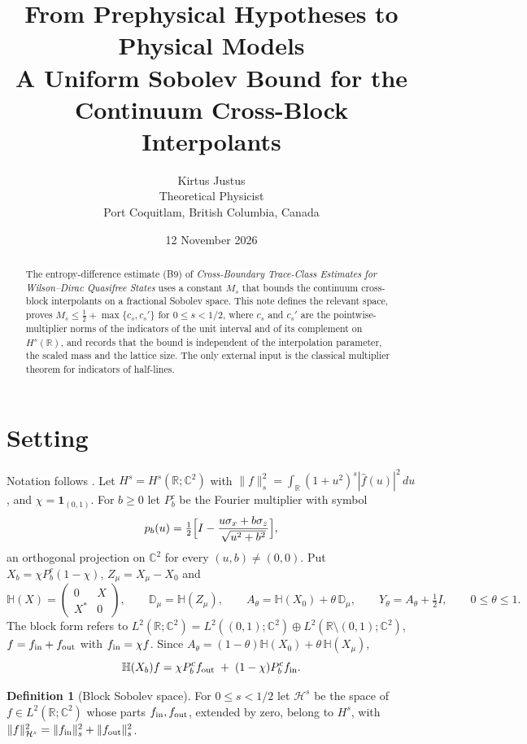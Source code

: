 \documentclass[11pt,a4paper]{article}
\title{\color{ink}\sffamily\large From Prephysical Hypotheses to Physical Models\\[9pt]\LARGE A Uniform Sobolev Bound for the Continuum Cross-Block Interpolants}
\author{Kirtus Justus\\\small Theoretical Physicist\\\small Port Coquitlam, British Columbia, Canada}
\date{12 November 2026}
\theoremstyle{definition}\newtheorem{definition}[theorem]{Definition}
\begin{document}
\maketitle
\begin{abstract}
The entropy-difference estimate (B9) of \emph{Cross-Boundary Trace-Class Estimates for Wilson--Dirac Quasifree States} uses a constant $M_s$ that bounds the continuum cross-block interpolants on a fractional Sobolev space. This note defines the relevant space, proves $M_s\le \tfrac12+\max\{c_s,c_s'\}$ for $0\le s<1/2$, where $c_s$ and $c_s'$ are the pointwise-multiplier norms of the indicators of the unit interval and of its complement on $H^s(\mathbb R)$, and records that the bound is independent of the interpolation parameter, the scaled mass and the lattice size. The only external input is the classical multiplier theorem for indicators of half-lines.
\end{abstract}

\section{Setting}
Notation follows \cite{cross}. Let $H^s=H^s(\mathbb R;\mathbb C^2)$ with $\|f\|_s^2=\int_{\mathbb R}(1+u^2)^s|\hat f(u)|^2\,du$, and $\chi=\mathbf 1_{(0,1)}$. For $b\ge0$ let $P_b^c$ be the Fourier multiplier with symbol
\[
p_b(u)=\tfrac12\Bigl[I-\frac{u\sigma_x+b\sigma_z}{\sqrt{u^2+b^2}}\Bigr],
\]
an orthogonal projection on $\mathbb C^2$ for every $(u,b)\ne(0,0)$. Put $X_b=\chi P_b^c(1-\chi)$, $Z_\mu=X_\mu-X_0$ and
\[
\mathbb H(X)=\begin{pmatrix}0&X\\X^*&0\end{pmatrix},\qquad
\mathbb D_\mu=\mathbb H(Z_\mu),\qquad A_\theta=\mathbb H(X_0)+\theta\,\mathbb D_\mu,\qquad Y_\theta=A_\theta+\tfrac12 I,\qquad 0\le\theta\le1 .
\]
The block form refers to $L^2(\mathbb R;\mathbb C^2)=L^2((0,1);\mathbb C^2)\oplus L^2(\mathbb R\setminus(0,1);\mathbb C^2)$, $f=f_{\rm in}+f_{\rm out}$ with $f_{\rm in}=\chi f$. Since $A_\theta=(1-\theta)\mathbb H(X_0)+\theta\,\mathbb H(X_\mu)$,
\begin{equation}\label{eq:action}
\mathbb H(X_b)f=\chi P_b^c f_{\rm out}\;+\;(1-\chi)P_b^c f_{\rm in}.
\end{equation}

\begin{definition}[Block Sobolev space]
For $0\le s<1/2$ let $\mathcal H^s$ be the space of $f\in L^2(\mathbb R;\mathbb C^2)$ whose parts $f_{\rm in},f_{\rm out}$, extended by zero, belong to $H^s$, with
$\|f\|_{\mathcal H^s}^2=\|f_{\rm in}\|_s^2+\|f_{\rm out}\|_s^2$.
\end{definition}
\end{document}

